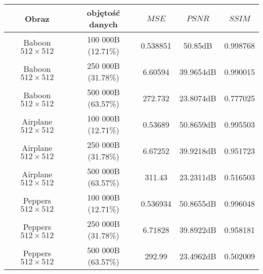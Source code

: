 {    \begin{center}
        \begin{tabular}{ |c|c|c c c| }
            \hline
            Obraz & objętość danych & $MSE$ & $PSNR$ & $SSIM$ \\
            \hline
            Baboon {\footnotesize $512 \times 512$}   & 100 000B (12.71\%) & 0.538851 & 50.85dB & 0.998768 \\
            Baboon {\footnotesize $512 \times 512$}   & 250 000B (31.78\%) & 6.60594 & 39.9654dB & 0.990015 \\
            Baboon {\footnotesize $512 \times 512$}   & 500 000B (63.57\%) & 272.732 & 23.8074dB & 0.777025 \\
            Airplane {\footnotesize $512 \times 512$} & 100 000B (12.71\%) & 0.53689 & 50.8659dB & 0.995503 \\
            Airplane {\footnotesize $512 \times 512$} & 250 000B (31.78\%) & 6.67252 & 39.9218dB & 0.951723 \\
            Airplane {\footnotesize $512 \times 512$} & 500 000B (63.57\%) & 311.43 & 23.2311dB & 0.516503 \\
            Peppers {\footnotesize $512 \times 512$}  & 100 000B (12.71\%) & 0.536934 & 50.8655dB & 0.996048 \\
            Peppers {\footnotesize $512 \times 512$}  & 250 000B (31.78\%) & 6.71828 & 39.8922dB & 0.958181 \\
            Peppers {\footnotesize $512 \times 512$}  & 500 000B (63.57\%) & 292.99 & 23.4962dB & 0.502009 \\
            \hline
        \end{tabular}
        \label{tab:exp-vertex-results}
    \end{center}

}
